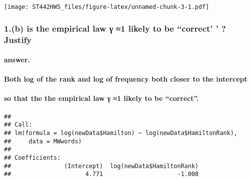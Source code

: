 \documentclass[
]{article}
\newenvironment{Shaded}{\begin{snugshade}}{\end{snugshade}}
\newcommand{\AttributeTok}[1]{\textcolor[rgb]{0.77,0.63,0.00}{#1}}
\newcommand{\FunctionTok}[1]{\textcolor[rgb]{0.00,0.00,0.00}{#1}}
\newcommand{\NormalTok}[1]{#1}
\newcommand{\OtherTok}[1]{\textcolor[rgb]{0.56,0.35,0.01}{#1}}
\newcommand{\SpecialCharTok}[1]{\textcolor[rgb]{0.00,0.00,0.00}{#1}}
\begin{document}
\texttt{[image: ST442HW5\_files/figure-latex/unnamed-chunk-3-1.pdf]}

\hypertarget{b-is-the-empirical-law-ux3b3-1-likely-to-be-correct-justify}{%
\subsubsection{1.(b) is the empirical law γ ≈1 likely to be ``correct' '
?
Justify}\label{b-is-the-empirical-law-ux3b3-1-likely-to-be-correct-justify}}

\hypertarget{answer.}{%
\paragraph{answer.}\label{answer.}}

\hypertarget{both-log-of-the-rank-and-log-of-frequency-both-closer-to-the-intercept}{%
\paragraph{Both log of the rank and log of frequency both closer to the
intercept}\label{both-log-of-the-rank-and-log-of-frequency-both-closer-to-the-intercept}}

\hypertarget{so-that-the-the-empirical-law-ux3b3-1-likely-to-be-correct.}{%
\paragraph{so that the the empirical law γ ≈1 likely to be
``correct''.}\label{so-that-the-the-empirical-law-ux3b3-1-likely-to-be-correct.}}

\begin{Shaded}
\end{Shaded}

\begin{verbatim}
## 
## Call:
## lm(formula = log(newData$Hamilton) ~ log(newData$HamiltonRank), 
##     data = MWwords)
## 
## Coefficients:
##               (Intercept)  log(newData$HamiltonRank)  
##                     4.771                     -1.008
\end{verbatim}
\end{document}

